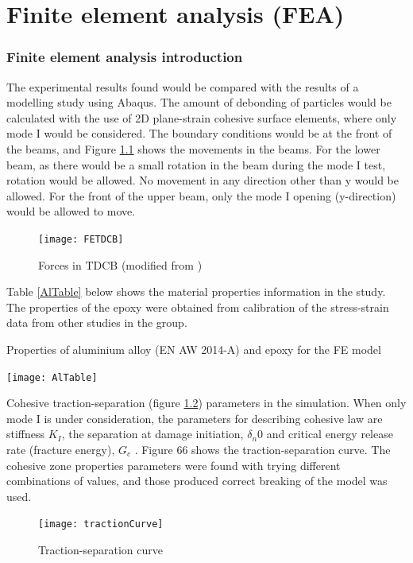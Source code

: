 \documentclass[numbers=noendperiod,chapterprefix=on]{icldt} %
\begin{document}
{\chapter{Finite element analysis (FEA)} \label{FE_intro}
\subsection{Finite element analysis introduction}
The experimental results found would be compared with the results of a modelling study using Abaqus. The amount of debonding of particles would be calculated with the use of 2D plane-strain cohesive surface elements, where only mode I would be considered. The boundary conditions would be at the front of the beams, and Figure \ref{FETDCB} shows the movements in the beams. For the lower beam, as there would be a small rotation in the beam during the mode I test, rotation would be allowed. No movement in any direction other than y would be allowed. For the front of the upper beam, only the mode I opening (y-direction) would be allowed to move. 

\begin{figure}[!htpb]
\centering
\texttt{[image: FETDCB]}
\caption{Forces in TDCB (modified from \cite{Brett2011})}\label{FETDCB}
\end{figure}
\FloatBarrier

Table \ref{AlTable} below shows the material properties information in the study. The properties of the epoxy were obtained from calibration of the stress-strain data from other studies in the group.

\begin{table}[!htpb]
\centering
\caption{Properties of aluminium alloy (EN AW 2014-A) \cite{Brett2011} and epoxy \cite{Adnan2008} for the FE model} \label{AlTable}
\texttt{[image: AlTable]}
\end{table}
\FloatBarrier

Cohesive traction-separation (figure \ref{tractionCurve}) parameters in the simulation. When only mode I is under consideration, the parameters for describing cohesive law are stiffness $K_I$, the separation at damage initiation, $\delta_n0$ and critical energy release rate (fracture energy), $G_c$ \cite{Brett2011}. Figure 66 shows the traction-separation curve. The cohesive zone properties parameters were found with trying different combinations of values, and those produced correct breaking of the model was used.

\begin{figure}[!htpb]
\centering
\texttt{[image: tractionCurve]}
\caption{Traction-separation curve \cite{Brett2011}}\label{tractionCurve}
\end{figure}
\FloatBarrier

}
\end{document}
